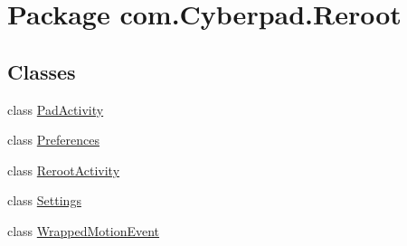 \hypertarget{namespacecom_1_1_cyberpad_1_1_reroot}{
\section{\-Package com.\-Cyberpad.\-Reroot}
\label{namespacecom_1_1_cyberpad_1_1_reroot}
}
\subsection*{\-Classes}
\begin{DoxyCompactItemize}
\item 
class \hyperlink{classcom_1_1_cyberpad_1_1_reroot_1_1_pad_activity}{\-Pad\-Activity}
\item 
class \hyperlink{classcom_1_1_cyberpad_1_1_reroot_1_1_preferences}{\-Preferences}
\item 
class \hyperlink{classcom_1_1_cyberpad_1_1_reroot_1_1_reroot_activity}{\-Reroot\-Activity}
\item 
class \hyperlink{classcom_1_1_cyberpad_1_1_reroot_1_1_settings}{\-Settings}
\item 
class \hyperlink{classcom_1_1_cyberpad_1_1_reroot_1_1_wrapped_motion_event}{\-Wrapped\-Motion\-Event}
\end{DoxyCompactItemize}
